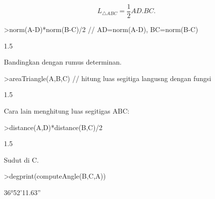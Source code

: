 \documentclass[a4paper,10pt]{article}
\begin{document}
\begin{eulernotebook}
\begin{eulercomment}
\begin{eulercomment}
\begin{eulercomment}
\begin{eulercomment}
\begin{eulercomment}
\begin{eulercomment}
\begin{eulercomment}
\begin{eulercomment}
\begin{eulercomment}
\begin{eulercomment}
\begin{eulercomment}
\begin{eulercomment}
\begin{eulercomment}
\begin{eulercomment}
\begin{eulercomment}
\begin{eulercomment}
\begin{eulercomment}
\begin{eulercomment}
\begin{eulercomment}
\begin{eulercomment}
\begin{eulercomment}
\begin{eulercomment}
\begin{eulercomment}
\begin{eulercomment}
\begin{eulercomment}
\begin{eulercomment}
\begin{eulercomment}
\begin{eulercomment}
\begin{eulercomment}
\begin{eulercomment}
\begin{eulercomment}
\begin{eulercomment}
\begin{eulercomment}
\begin{eulercomment}
\begin{eulercomment}
\begin{eulercomment}
\begin{eulercomment}
\begin{eulercomment}
\begin{eulercomment}
\end{eulercomment}
\begin{eulerformula}
\[
L_{\triangle ABC}= \frac{1}{2}AD.BC.
\]
\end{eulerformula}
\begin{eulerprompt}
>norm(A-D)*norm(B-C)/2 // AD=norm(A-D), BC=norm(B-C)
\end{eulerprompt}
\begin{euleroutput}
  1.5
\end{euleroutput}
\begin{eulercomment}
Bandingkan dengan rumus determinan.
\end{eulercomment}
\begin{eulerprompt}
>areaTriangle(A,B,C) // hitung luas segitiga langusng dengan fungsi
\end{eulerprompt}
\begin{euleroutput}
  1.5
\end{euleroutput}
\begin{eulercomment}
Cara lain menghitung luas segitigas ABC:
\end{eulercomment}
\begin{eulerprompt}
>distance(A,D)*distance(B,C)/2
\end{eulerprompt}
\begin{euleroutput}
  1.5
\end{euleroutput}
\begin{eulercomment}
Sudut di C.
\end{eulercomment}
\begin{eulerprompt}
>degprint(computeAngle(B,C,A))
\end{eulerprompt}
\begin{euleroutput}
  36°52'11.63''

\end{euleroutput}
\end{eulercomment}
\end{eulercomment}
\end{eulercomment}
\end{eulercomment}
\end{eulercomment}
\end{eulercomment}
\end{eulercomment}
\end{eulercomment}
\end{eulercomment}
\end{eulercomment}
\end{eulercomment}
\end{eulercomment}
\end{eulercomment}
\end{eulercomment}
\end{eulercomment}
\end{eulercomment}
\end{eulercomment}
\end{eulercomment}
\end{eulercomment}
\end{eulercomment}
\end{eulercomment}
\end{eulercomment}
\end{eulercomment}
\end{eulercomment}
\end{eulercomment}
\end{eulercomment}
\end{eulercomment}
\end{eulercomment}
\end{eulercomment}
\end{eulercomment}
\end{eulercomment}
\end{eulercomment}
\end{eulercomment}
\end{eulercomment}
\end{eulercomment}
\end{eulercomment}
\end{eulercomment}
\end{eulercomment}
\end{eulernotebook}
\end{document}
